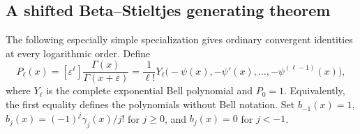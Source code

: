 \documentclass[11pt]{article}
\numberwithin{equation}{section}
\theoremstyle{definition}\newtheorem{definition}[theorem]{Definition}
\theoremstyle{remark}\newtheorem{remark}[theorem]{Remark}
\begin{document}
\subsection{A shifted Beta--Stieltjes generating theorem}

The following especially simple specialization gives ordinary convergent
identities at every logarithmic order. Define
\begin{equation}\label{agrc:Pell}
 P_\ell(x)=[\varepsilon^\ell]\frac{\Gamma(x)}{\Gamma(x+\varepsilon)}
 =\frac1{\ell!}Y_\ell\bigl(-\psi(x),-\psi'(x),\ldots,
                                      -\psi^{(\ell-1)}(x)\bigr),
\end{equation}
where $Y_\ell$ is the complete exponential Bell polynomial and $P_0=1$.
Equivalently, the first equality defines the polynomials without Bell
notation. Set $b_{-1}(x)=1$, $b_j(x)=(-1)^j\gamma_j(x)/j!$ for $j\geq0$,
and $b_j(x)=0$ for $j<-1$.
\end{document}
